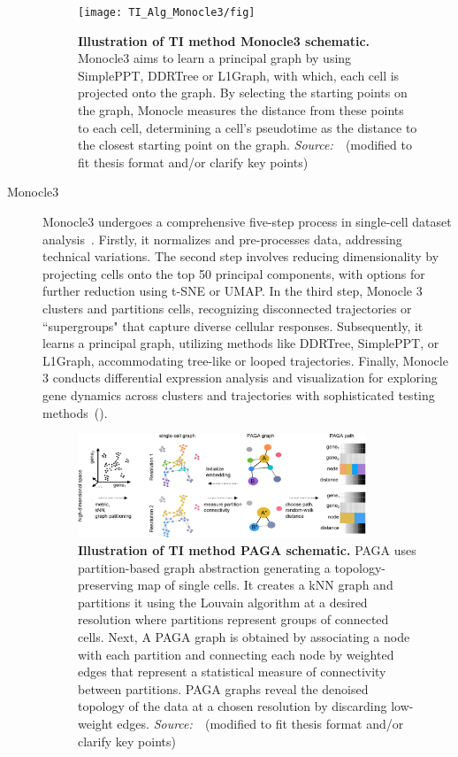 \begin{description}
\begin{figure}[h!]
  	\centering
  	\texttt{[image: TI\_Alg\_Monocle3/fig]}
  	\vspace{0.1cm}
  	\caption[Illustration of TI method Monocle3 schematic.]{\textbf{Illustration of TI method Monocle3 schematic.} Monocle3 aims to learn a principal graph by using SimplePPT, DDRTree or L1Graph, with which, each cell is projected onto the graph. By selecting the starting points on the graph, Monocle measures the distance from these points to each cell, determining a cell's pseudotime as the distance to the closest starting point on the graph. \emph{Source:~\cite{cao2019monocle3}}~(modified to fit thesis format and/or clarify key points)
  	}
  	\label{fig:TI_Alg_Monocle3}
\end{figure}

  \item[Monocle3]
  Monocle3 undergoes a comprehensive five-step process in single-cell dataset analysis~\citep{cao2019monocle3}. Firstly, it normalizes and pre-processes data, addressing technical variations. The second step involves reducing dimensionality by projecting cells onto the top 50 principal components, with options for further reduction using t-SNE or UMAP. In the third step, Monocle 3 clusters and partitions cells, recognizing disconnected trajectories or ``supergroups" that capture diverse cellular responses. Subsequently, it learns a principal graph, utilizing methods like DDRTree, SimplePPT, or L1Graph, accommodating tree-like or looped trajectories. Finally, Monocle 3 conducts differential expression analysis and visualization for exploring gene dynamics across clusters and trajectories with sophisticated testing methods~().

\begin{figure}[h!]
  	\centering
  	\includegraphics[width=0.85\textwidth]{TI_Alg_PAGA/fig}
  	\vspace{0.1cm}
  	\caption[Illustration of TI method PAGA schematic.]{\textbf{Illustration of TI method PAGA schematic.}
  	PAGA uses partition-based graph abstraction generating a topology-preserving map of single cells. It creates a kNN graph and partitions it using the Louvain algorithm at a desired resolution where partitions represent groups of connected cells. Next, A PAGA graph is obtained by associating a node with each partition and connecting each node by weighted edges that represent a statistical measure of connectivity between partitions. PAGA graphs reveal the denoised topology of the data at a chosen resolution by discarding low-weight edges. \emph{Source:~\cite{wolf2019paga}}~(modified to fit thesis format and/or clarify key points)
  	}
  	\label{fig:TI_Alg_PAGA}
\end{figure}


\end{description}
